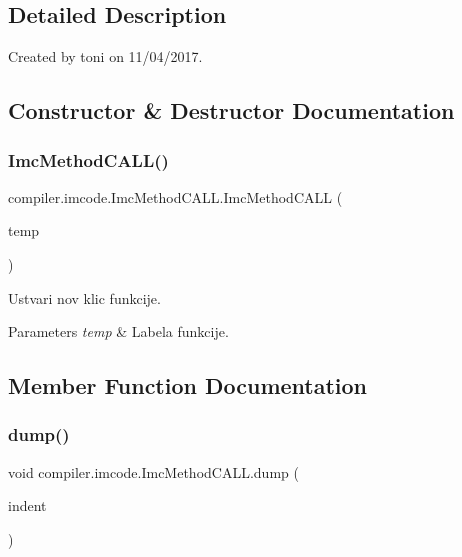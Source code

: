 \subsection{Detailed Description}
Created by toni on 11/04/2017. 

\subsection{Constructor \& Destructor Documentation}
\mbox{\label{classcompiler_1_1imcode_1_1_imc_method_c_a_l_l_af7be07b40dec082e2ea56f8a494491af}} 
\subsubsection{\texorpdfstring{Imc\+Method\+C\+A\+L\+L()}{ImcMethodCALL()}}
{\footnotesize\ttfamily compiler.\+imcode.\+Imc\+Method\+C\+A\+L\+L.\+Imc\+Method\+C\+A\+LL (\begin{DoxyParamCaption}\item[{\hyperlink{classcompiler_1_1frames_1_1_frm_temp}{Frm\+Temp}}]{temp }\end{DoxyParamCaption})}

Ustvari nov klic funkcije.


\begin{DoxyParams}{Parameters}
{\em temp} & Labela funkcije. \\
\hline
\end{DoxyParams}


\subsection{Member Function Documentation}
\mbox{\label{classcompiler_1_1imcode_1_1_imc_method_c_a_l_l_a43e53dfa27eb848d9168b20e9e0bd972}} 
\subsubsection{\texorpdfstring{dump()}{dump()}}
{\footnotesize\ttfamily void compiler.\+imcode.\+Imc\+Method\+C\+A\+L\+L.\+dump (\begin{DoxyParamCaption}\item[{int}]{indent }\end{DoxyParamCaption})}

